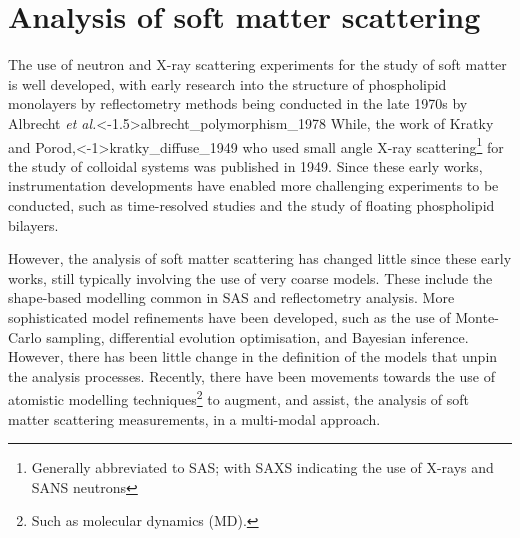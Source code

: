 \section{Analysis of soft matter scattering}
The use of neutron and X-ray scattering experiments for the study of soft matter is well developed, with early research into the structure of phospholipid monolayers by reflectometry methods being conducted in the late 1970s by Albrecht \emph{et al.}\sidecite<-1.5\baselineskip>{albrecht_polymorphism_1978}
While, the work of Kratky and Porod,\sidecite<-1\baselineskip>{kratky_diffuse_1949} who used small angle X-ray scattering\footnote{Generally abbreviated to SAS; with SAXS indicating the use of X-rays and SANS neutrons} for the study of colloidal systems was published in 1949.
Since these early works, instrumentation developments have enabled more challenging experiments to be conducted, such as time-resolved studies \autocite{jensen_monitoring_2014} and the study of floating phospholipid bilayers.\autocite{rondelli_reflectivity_2012}

However, the analysis of soft matter scattering has changed little since these early works, still typically involving the use of very coarse models.
These include the shape-based modelling common in SAS \autocite[][see Section~\ref{sec:sasanal}]{hassan_small_2003} and reflectometry analysis.\autocite[][see Section~\ref{sec:sasanal}]{campbell_structure_2018,lu_analysis_1996}
More sophisticated model refinements have been developed, such as the use of Monte-Carlo sampling,\autocite{pedersen_monte_2002} differential evolution optimisation,\autocite[abbreviated to DE]{wormington_characterization_1999} and Bayesian inference.\autocite{nelson_refnx_2019,larsen_analysis_2018}
However, there has been little change in the definition of the models that unpin the analysis processes.
Recently, there have been movements towards the use of atomistic modelling techniques\footnote{Such as molecular dynamics (MD).} to augment, and assist, the analysis of soft matter scattering measurements, in a multi-modal approach.\autocite{scoppola_combining_2018}

